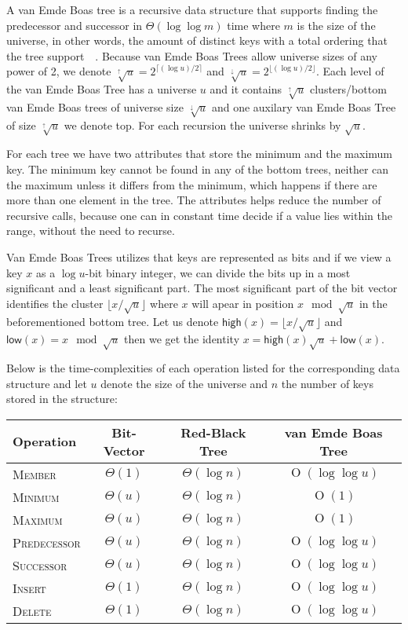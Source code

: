 \documentclass[oneside,11pt,openright]{report}
\newcommand{\BigO}[1]{\ensuremath{\operatorname{O}\left(#1\right)}}
\newcommand{\BigT}[1]{\ensuremath{\Theta\left(#1\right)}}
\newcommand{\Insert}{\textsc{Insert}}
\newcommand{\Delete}{\textsc{Delete}}
\newcommand{\Member}{\textsc{Member}}
\newcommand{\Minimum}{\textsc{Minimum}}
\newcommand{\Maximum}{\textsc{Maximum}}
\newcommand{\Predecessor}{\textsc{Predecessor}}
\newcommand{\Successor}{\textsc{Successor}}
\newcommand{\HIGH}{\textsf{high}}
\newcommand{\LOW}{\textsf{low}}
\newcommand{\HIGHER}{\sqrt[\uparrow]{u}}
\newcommand{\LOWER}{\sqrt[\downarrow]{u}}
\begin{document}
A  van Emde  Boas tree  is a  recursive data  structure that  supports
finding the predecessor and successor in \BigT{\log \log m} time where
$m$  is the  size  of the  universe,  in other  words,  the amount  of
distinct    keys   with    a    total   ordering    that   the    tree
support~\cite[p. 545]{ITA09}~\cite{VEB04}. Because van Emde Boas Trees
allow  universe  sizes  of  any  power of  2,  we  denote  $\HIGHER  =
2^{\lceil{(\log   u)/2}\rceil}$   and   $\LOWER   =   2^{\lfloor{(\log
    u)/2}\rfloor}$.   Each level  of  the  van Emde  Boas  Tree has  a
universe $u$ and  it contains $\HIGHER$ clusters/bottom  van Emde Boas
trees of universe size $\LOWER$ and one auxilary van Emde Boas Tree of
size $\HIGHER$ we denote top.  For each recursion the universe shrinks
by $\sqrt{u}$.

For each  tree we have two  attributes that store the  minimum and the
maximum key.  The minimum  key cannot  be found in  any of  the bottom
trees, neither  can the  maximum unless it  differs from  the minimum,
which happens  if there  are more  than one element  in the  tree. The
attributes helps reduce the number of recursive calls, because one can
in constant time decide if a  value lies within the range, without the
need to recurse.

Van Emde Boas Trees utilizes that  keys are represented as bits and if
we view a key $x$ as a  $\log u$-bit binary integer, we can divide the
bits up in  a most significant and a least  significant part. The most
significant   part  of   the   bit  vector   identifies  the   cluster
$\lfloor{x/\sqrt{u}}\rfloor$ where $x$ will  apear in position $x \mod
\sqrt{u}$ in the beforementioned bottom  tree. Let us denote $\HIGH(x)
= \lfloor{x/\sqrt{u}}\rfloor$ and $\LOW(x) =  x \mod \sqrt{u}$ then we
get the identity $x = \HIGH(x) \sqrt{u} + \LOW(x)$.

Below  is  the time-complexities  of  each  operation listed  for  the
corresponding  data structure  and  let  $u$ denote  the  size of  the
universe and $n$ the number of keys stored in the structure:

\begin{center}
  \begin{tabular}{ l | c | c | c }
    Operation & Bit-Vector & Red-Black Tree & van Emde Boas Tree \\ \hline
    \Member & $\BigT{1}$ & $\BigT{\log n}$ & $\BigO{\log \log u}$ \\ 
    \Minimum & $\BigT{u}$ & $\BigT{\log n}$ & $\BigO{1}$\\ 
    \Maximum & $\BigT{u}$ & $\BigT{\log n}$ & $\BigO{1}$ \\ 
    \Predecessor & $\BigT{u}$ & $\BigT{\log n}$ & $\BigO{\log \log u}$  \\ 
    \Successor & $\BigT{u}$ & $\BigT{\log n}$ & $\BigO{\log \log u}$ \\ 
    \Insert & $\BigT{1}$ & $\BigT{\log n}$ & $\BigO{\log \log u}$ \\ 
    \Delete & $\BigT{1}$ & $\BigT{\log n}$ & $\BigO{\log \log u}$ \\
  \end{tabular}
\end{center}
\end{document}
